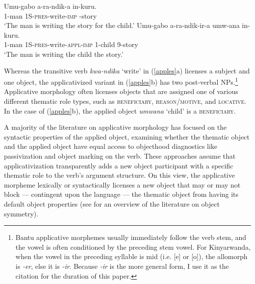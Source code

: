 \documentclass[output=paper]{langsci/langscibook}
\begin{document}
\begin{exe}
\ex\label{apples}
	\begin{xlist}
          \ex\gll Umu-gabo a-ra-ndik-a in-kuru.\\
          {\scshape 1}-man {\scshape 1S-pres}-write-{\scshape imp} {-}story\\
          \glt `The man is writing the story for the child.'
          \ex\gll Umu-gabo a-ra-ndik-ir-a umw-ana in-kuru.\\
          {\scshape 1}-man {\scshape 1S-pres}-write-{\scshape appl-imp} {\scshape 1-}child {\scshape 9-}story\\
          \glt `The man is writing the child the story.'
	\end{xlist}
\end{exe} 
%
Whereas the transitive verb \emph{kwa-ndika} `write' in (\ref{apples}a) licenses a subject and one object, the applicativized variant in (\ref{apples}b) has two post-verbal NPs.\footnote{Bantu applicative morphemes usually immediately follow  the verb stem, and the vowel is often conditioned by the preceding stem vowel. For Kinyarwanda, when the vowel in the preceding syllable is mid (i.e. [e] or [o]), the allomorph is \emph{-er}, else it is \emph{-ir}. Because \emph{-ir} is the more general form, I use it as the citation for the duration of this paper.}  Applicative morphology often licenses objects that are assigned one of various different thematic role types, such as {\scshape beneficiary, reason/motive,} and {\scshape locative}. In the case of (\ref{apples}b), the applied object  \emph{umwana} `child' is a {\scshape beneficiary}.

 A majority of the literature on applicative morphology has focused on the syntactic properties of the applied object, examining whether the thematic object and the applied object have equal access to objecthood diagnostics like passivization and object marking on the verb. These approaches assume that applicativization transparently adds a new object participant with a specific thematic role to the verb's argument structure.  On this view, the applicative morpheme lexically or syntactically licenses a new object that may or may not block --- contingent upon the language ---  the thematic object from having its default object properties (see  for an overview of the literature on object symmetry).
\end{document}
